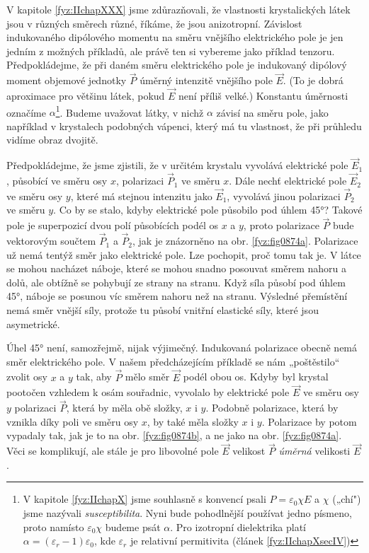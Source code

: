     V kapitole \ref{fyz:IIchapXXX} jsme zdůrazňovali, že vlastnosti krystalických látek jsou v
    různých směrech různé, říkáme, že jsou anizotropní. Závislost indukovaného dipólového momentu na
    směru vnějšího elektrického pole je jen jedním z možných příkladů, ale právě ten si vybereme
    jako příklad tenzoru. Předpokládejme, že při daném směru elektrického pole je indukovaný
    dipólový moment objemové jednotky \(\vec{P}\) úměrný intenzitě vnějšího pole \(\vec{E}\). (To je
    dobrá aproximace pro většinu látek, pokud \(\vec{E}\) není příliš velké.) Konstantu úměrnosti
    označíme \(\alpha\)\footnote{V kapitole \ref{fyz:IIchapX} jsme souhlasně s konvencí psali
    \(P=\varepsilon_0\chi E\) a \(\chi\) („chí") jsme nazývali \emph{susceptibilita}. Nyni bude
    pohodlnější používat jedno písmeno, proto namísto \(\varepsilon_0\chi\) budeme psát \(\alpha\).
    Pro izotropní dielektrika platí \(\alpha = (\varepsilon_r - 1)\varepsilon_0\), kde
    \(\varepsilon_r\) je relativní permitivita (článek \ref{fyz:IIchapXsecIV})}. Budeme uvažovat
    látky, v nichž \(\alpha\) závisí na směru pole, jako například v krystalech podobných vápenci,
    který má tu vlastnost, že při průhledu vidíme obraz dvojitě. 

    Předpokládejme, že jsme zjistili, že v určitém krystalu vyvolává elektrické pole \(\vec{E}_1\),
    působící ve směru osy \(x\), polarizaci \(\vec{P}_1\) ve směru \(x\). Dále nechť elektrické pole
    \(\vec{E}_2\) ve směru osy \(y\), které má stejnou intenzitu jako \(\vec{E}_1\), vyvolává jinou
    polarizaci \(\vec{P}_2\) ve směru \(y\). Co by se stalo, kdyby elektrické pole působilo pod
    úhlem \ang{45}? Takové pole je superpozicí dvou polí působících podél os \(x\) a \(y\), proto
    polarizace \(\vec{P}\) bude vektorovým součtem \(\vec{P}_1\) a \(\vec{P}_2\), jak je znázorněno
    na obr. \ref{fyz:fig0874a}. Polarizace už nemá tentýž směr jako elektrické pole. Lze pochopit,
    proč tomu tak je. V látce se mohou nacházet náboje, které se mohou snadno posouvat směrem nahoru
    a dolů, ale obtížně se pohybují ze strany na stranu. Když síla působí pod úhlem \ang{45}, náboje
    se posunou víc směrem nahoru než na stranu. Výsledné přemístění nemá směr vnější síly, protože
    tu působí vnitřní elastické síly, které jsou asymetrické.
    
    Úhel \ang{45} není, samozřejmě, nijak výjimečný. Indukovaná polarizace obecně nemá směr
    elektrického pole. V našem předcházejícím příkladě se nám „poštěstilo“ zvolit osy \(x\) a \(y\)
    tak, aby \(\vec{P}\) mělo směr \(\vec{E}\) podél obou os. Kdyby byl krystal pootočen vzhledem k
    osám souřadnic, vyvolalo by elektrické pole \(\vec{E}\) ve směru osy \(y\) polarizaci
    \(\vec{P}\), která by měla obě složky, \(x\) i \(y\). Podobně polarizace, která by vznikla díky
    poli ve směru osy \(x\), by také měla složky \(x\) i \(y\). Polarizace by potom vypadaly tak,
    jak je to na obr. \ref{fyz:fig0874b}, a ne jako na obr. \ref{fyz:fig0874a}. Věci se komplikují,
    ale stále je pro libovolné pole \(\vec{E}\) velikost \(\vec{P}\) \emph{úměrná} velikosti
    \(\vec{E}\). 
    
